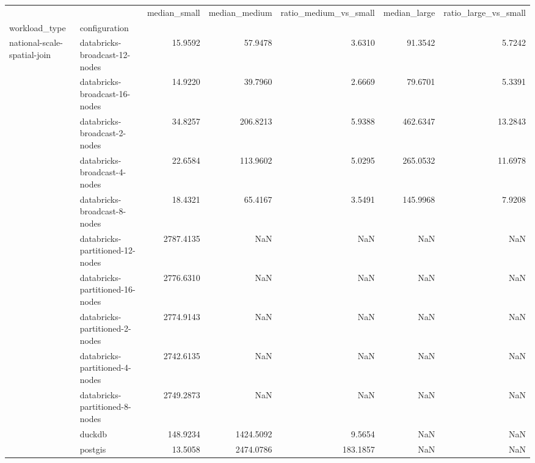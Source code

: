 \begin{tabular}{llrrrrr}
\toprule
 &  & median\_small & median\_medium & ratio\_medium\_vs\_small & median\_large & ratio\_large\_vs\_small \\
workload\_type & configuration &  &  &  &  &  \\
\midrule
\multirow[t]{12}{*}{national-scale-spatial-join} & databricks-broadcast-12-nodes & 15.9592 & 57.9478 & 3.6310 & 91.3542 & 5.7242 \\
 & databricks-broadcast-16-nodes & 14.9220 & 39.7960 & 2.6669 & 79.6701 & 5.3391 \\
 & databricks-broadcast-2-nodes & 34.8257 & 206.8213 & 5.9388 & 462.6347 & 13.2843 \\
 & databricks-broadcast-4-nodes & 22.6584 & 113.9602 & 5.0295 & 265.0532 & 11.6978 \\
 & databricks-broadcast-8-nodes & 18.4321 & 65.4167 & 3.5491 & 145.9968 & 7.9208 \\
 & databricks-partitioned-12-nodes & 2787.4135 & NaN & NaN & NaN & NaN \\
 & databricks-partitioned-16-nodes & 2776.6310 & NaN & NaN & NaN & NaN \\
 & databricks-partitioned-2-nodes & 2774.9143 & NaN & NaN & NaN & NaN \\
 & databricks-partitioned-4-nodes & 2742.6135 & NaN & NaN & NaN & NaN \\
 & databricks-partitioned-8-nodes & 2749.2873 & NaN & NaN & NaN & NaN \\
 & duckdb & 148.9234 & 1424.5092 & 9.5654 & NaN & NaN \\
 & postgis & 13.5058 & 2474.0786 & 183.1857 & NaN & NaN \\
\cline{1-7}
\bottomrule
\end{tabular}

